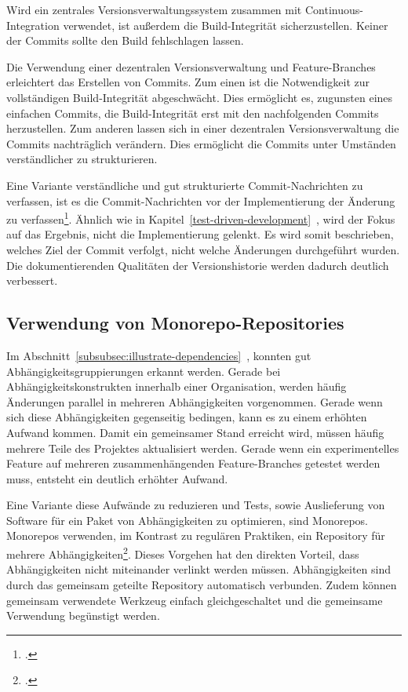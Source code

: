 Wird ein zentrales Versionsverwaltungssystem zusammen mit Continuous-Integration verwendet, ist außerdem die Build-Integrität sicherzustellen. Keiner der Commits sollte den Build fehlschlagen lassen. 

Die Verwendung einer dezentralen Versionsverwaltung und Feature-Branches erleichtert das Erstellen von Commits. Zum einen ist die Notwendigkeit zur vollständigen Build-Integrität abgeschwächt. Dies ermöglicht es, zugunsten eines einfachen Commits, die Build-Integrität erst mit den nachfolgenden Commits herzustellen. Zum anderen lassen sich in einer dezentralen Versionsverwaltung die Commits nachträglich verändern. Dies ermöglicht die Commits unter Umständen verständlicher zu strukturieren.

Eine Variante verständliche und gut strukturierte Commit-Nachrichten zu verfassen, ist es die Commit-Nachrichten vor der Implementierung der Änderung zu verfassen\footcite[Writing commit messages before starting to code][]{git-essentials-2017}. Ähnlich wie in Kapitel~\ref{test-driven-development}~, wird der Fokus auf das Ergebnis, nicht die Implementierung gelenkt. Es wird somit beschrieben, welches Ziel der Commit verfolgt, nicht welche Änderungen durchgeführt wurden. Die dokumentierenden Qualitäten der Versionshistorie werden dadurch deutlich verbessert.

\subsection{Verwendung von Monorepo-Repositories}

Im Abschnitt~\ref{subsubsec:illustrate-dependencies}~\glqq {}\grqq{}, konnten gut Abhängigkeitsgruppierungen erkannt werden. Gerade bei Abhängigkeitskonstrukten innerhalb einer Organisation, werden häufig Änderungen parallel in mehreren Abhängigkeiten vorgenommen. Gerade wenn sich diese Abhängigkeiten gegenseitig bedingen, kann es zu einem erhöhten Aufwand kommen. Damit ein gemeinsamer Stand erreicht wird, müssen häufig mehrere Teile des Projektes aktualisiert werden. Gerade wenn ein experimentelles Feature auf mehreren zusammenhängenden Feature-Branches getestet werden muss, entsteht ein deutlich erhöhter Aufwand.

Eine Variante diese Aufwände zu reduzieren und Tests, sowie Auslieferung von Software für ein Paket von Abhängigkeiten zu optimieren, sind Monorepos. Monorepos verwenden, im Kontrast zu regulären Praktiken, ein Repository für mehrere Abhängigkeiten\footcite{trunkbaseddevelopment-monorepo}. Dieses Vorgehen hat den direkten Vorteil, dass Abhängigkeiten nicht miteinander verlinkt werden müssen. Abhängigkeiten sind durch das gemeinsam geteilte Repository automatisch verbunden. Zudem können gemeinsam verwendete Werkzeug einfach gleichgeschaltet und die gemeinsame Verwendung begünstigt werden.

